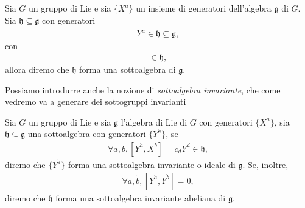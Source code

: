\begin{definition}[sottoalgebra]
    Sia $G$ un gruppo di Lie e sia $\{ X^a\}$ un insieme di generatori dell'algebra $\mathfrak{g}$ di $G$. Sia $\mathfrak{h} \subseteq \mathfrak{g}$ con generatori
    \begin{align}
        Y^{{\dot{a}}} \in \mathfrak{h} \subseteq \mathfrak{g},
    \end{align}
    con
    \begin{align}
        [Y^{{\dot{a}}}, Y^{{\dot{b}}}] \in \mathfrak{h},
    \end{align}
    allora diremo che $\mathfrak{h}$ forma una sottoalgebra di $\mathfrak{g}$.
\end{definition}
Possiamo introdurre anche la nozione di \emph{sottoalgebra invariante}, che come vedremo va a generare dei sottogruppi invarianti

\begin{definition}
    Sia $G$ un gruppo di Lie e sia $\mathfrak{g}$ l'algebra di Lie di $G$ con generatori $\{ X^a \}$, sia $\mathfrak{h} \subseteq \mathfrak{g}$ una sottoalgebra con generatori $\{ Y^{\dot{a}} \}$, se
    \begin{align}
        \forall {\dot{a}}, b, [Y^{\dot{a}}, X^{b}] = c_d Y^d \in \mathfrak{h},
    \end{align}
    diremo che $\{Y^{\dot{a}} \}$ forma una sottoalgebra invariante o ideale di $\mathfrak{g}$. Se, inoltre,
    \begin{align}
        \forall {\dot{a}}, {\dot{b}}, [Y^{\dot{a}}, Y^{\dot{b}}] = 0,
    \end{align}
    diremo che $\mathfrak{h}$ forma una sottoalgebra invariante abeliana di $\mathfrak{g}$.
\end{definition}

